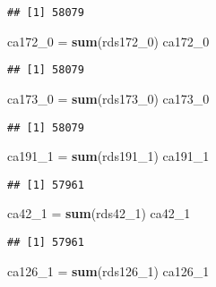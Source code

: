 \documentclass[
]{article}
\newenvironment{Shaded}{\begin{snugshade}}{\end{snugshade}}
\newcommand{\DecValTok}[1]{\textcolor[rgb]{0.00,0.00,0.81}{#1}}
\newcommand{\KeywordTok}[1]{\textcolor[rgb]{0.13,0.29,0.53}{\textbf{#1}}}
\newcommand{\NormalTok}[1]{#1}
\newcommand{\StringTok}[1]{\textcolor[rgb]{0.31,0.60,0.02}{#1}}
\begin{document}
\begin{verbatim}
## [1] 58079
\end{verbatim}

\begin{Shaded}
\begin{Highlighting}[]
\NormalTok{ca172_}\DecValTok{0}\NormalTok{ =}\StringTok{ }\KeywordTok{sum}\NormalTok{(rds172_}\DecValTok{0}\NormalTok{)}
\NormalTok{ca172_}\DecValTok{0}
\end{Highlighting}
\end{Shaded}

\begin{verbatim}
## [1] 58079
\end{verbatim}

\begin{Shaded}
\begin{Highlighting}[]
\NormalTok{ca173_}\DecValTok{0}\NormalTok{ =}\StringTok{ }\KeywordTok{sum}\NormalTok{(rds173_}\DecValTok{0}\NormalTok{)}
\NormalTok{ca173_}\DecValTok{0}
\end{Highlighting}
\end{Shaded}

\begin{verbatim}
## [1] 58079
\end{verbatim}

\begin{Shaded}
\begin{Highlighting}[]
\NormalTok{ca191_}\DecValTok{1}\NormalTok{ =}\StringTok{ }\KeywordTok{sum}\NormalTok{(rds191_}\DecValTok{1}\NormalTok{)}
\NormalTok{ca191_}\DecValTok{1}
\end{Highlighting}
\end{Shaded}

\begin{verbatim}
## [1] 57961
\end{verbatim}

\begin{Shaded}
\begin{Highlighting}[]
\NormalTok{ca42_}\DecValTok{1}\NormalTok{ =}\StringTok{ }\KeywordTok{sum}\NormalTok{(rds42_}\DecValTok{1}\NormalTok{)}
\NormalTok{ca42_}\DecValTok{1}
\end{Highlighting}
\end{Shaded}

\begin{verbatim}
## [1] 57961
\end{verbatim}

\begin{Shaded}
\begin{Highlighting}[]
\NormalTok{ca126_}\DecValTok{1}\NormalTok{ =}\StringTok{ }\KeywordTok{sum}\NormalTok{(rds126_}\DecValTok{1}\NormalTok{)}
\NormalTok{ca126_}\DecValTok{1}
\end{Highlighting}
\end{Shaded}
\end{document}
